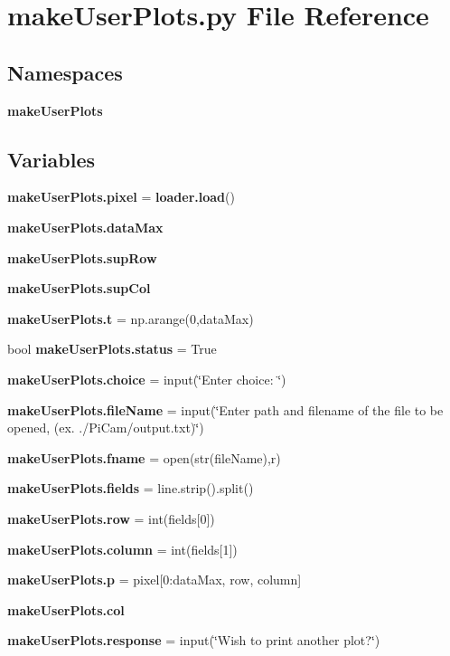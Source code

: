 \section{make\+User\+Plots.\+py File Reference}
\label{make_user_plots_8py}
\subsection*{Namespaces}
\begin{DoxyCompactItemize}
\item 
 \textbf{ make\+User\+Plots}
\end{DoxyCompactItemize}
\subsection*{Variables}
\begin{DoxyCompactItemize}
\item 
\textbf{ make\+User\+Plots.\+pixel} = \textbf{ loader.\+load}()
\item 
\textbf{ make\+User\+Plots.\+data\+Max}
\item 
\textbf{ make\+User\+Plots.\+sup\+Row}
\item 
\textbf{ make\+User\+Plots.\+sup\+Col}
\item 
\textbf{ make\+User\+Plots.\+t} = np.\+arange(0,data\+Max)
\item 
bool \textbf{ make\+User\+Plots.\+status} = True
\item 
\textbf{ make\+User\+Plots.\+choice} = input(\char`\"{}Enter choice\+: \char`\"{})
\item 
\textbf{ make\+User\+Plots.\+file\+Name} = input(\char`\"{}Enter path and filename of the file to be opened, (ex. \textquotesingle{}./Pi\+Cam/output.\+txt\textquotesingle{})\char`\"{})
\item 
\textbf{ make\+User\+Plots.\+fname} = open(str(file\+Name),\textquotesingle{}r\textquotesingle{})
\item 
\textbf{ make\+User\+Plots.\+fields} = line.\+strip().split()
\item 
\textbf{ make\+User\+Plots.\+row} = int(fields[0])
\item 
\textbf{ make\+User\+Plots.\+column} = int(fields[1])
\item 
\textbf{ make\+User\+Plots.\+p} = pixel[0\+:data\+Max, row, column]
\item 
\textbf{ make\+User\+Plots.\+col}
\item 
\textbf{ make\+User\+Plots.\+response} = input(\char`\"{}Wish to print another plot?\char`\"{})
\end{DoxyCompactItemize}
